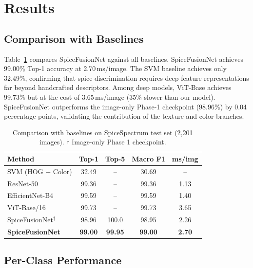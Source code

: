 \documentclass[conference]{IEEEtran}
\begin{document}
\section{Results}
\label{sec:results}

\subsection{Comparison with Baselines}

Table~\ref{tab:baselines} compares SpiceFusionNet against all baselines.
SpiceFusionNet achieves 99.00\% Top-1 accuracy at 2.70\,ms/image. The SVM baseline
achieves only 32.49\%, confirming that spice discrimination requires deep feature
representations far beyond handcrafted descriptors. Among deep models, ViT-Base
achieves 99.73\% but at the cost of 3.65\,ms/image (35\% slower than our model).
SpiceFusionNet outperforms the image-only Phase-1 checkpoint (98.96\%) by 0.04
percentage points, validating the contribution of the texture and color branches.

\begin{table}[t]
\centering
\caption{Comparison with baselines on SpiceSpectrum test set (2,201 images).
$\dagger$ Image-only Phase 1 checkpoint.}
\label{tab:baselines}
\setlength{\tabcolsep}{4pt}
\begin{tabular}{lcccc}
\toprule
\textbf{Method} & \textbf{Top-1} & \textbf{Top-5} & \textbf{Macro F1} & \textbf{ms/img} \\
\midrule
SVM (HOG + Color)         & 32.49 & --    & 30.69 & --   \\
ResNet-50                 & 99.36 & --    & 99.36 & 1.13 \\
EfficientNet-B4           & 99.59 & --    & 99.59 & 1.40 \\
ViT-Base/16               & 99.73 & --    & 99.73 & 3.65 \\
\midrule
SpiceFusionNet$^\dagger$  & 98.96 & 100.0 & 98.95 & 2.26 \\
\textbf{SpiceFusionNet}   & \textbf{99.00} & \textbf{99.95} & \textbf{99.00} & \textbf{2.70} \\
\bottomrule
\end{tabular}
\end{table}

\subsection{Per-Class Performance}
\end{document}
